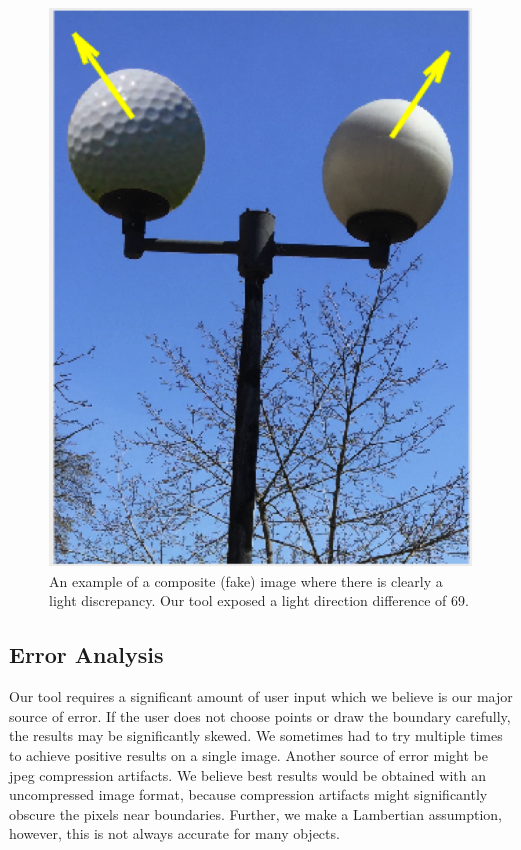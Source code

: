 \documentclass[10pt,twocolumn,letterpaper]{article}
\begin{document}
\begin{figure}[htpb]
\begin{center}
	\includegraphics[width=0.9\linewidth]{golfball_fake_labeled.png}
\end{center}
	\caption{An example of a composite (fake) image where there is clearly a light discrepancy. Our tool exposed a light direction difference of 69\textdegree.}
\label{img:golfFake}
\end{figure}

\subsection{Error Analysis}
Our tool requires a significant amount of user input which we believe is our major source of error. If the user does not choose points or draw the boundary carefully, the results may be significantly skewed. We sometimes had to try multiple times to achieve positive results on a single image. Another source of error might be jpeg compression artifacts. We believe best results would be obtained with an uncompressed image format, because compression artifacts might significantly obscure the pixels near boundaries. Further, we make a Lambertian assumption, however, this is not always accurate for many objects.
\end{document}
